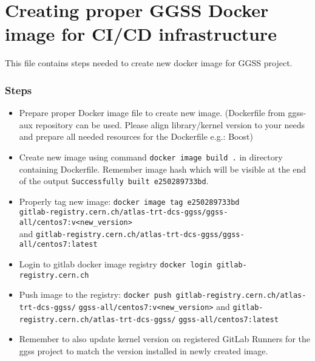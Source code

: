 \clearpage
\section{Creating proper GGSS Docker image for CI/CD infrastructure}
This file contains steps needed to create new docker image for GGSS project.

\subsubsection*{Steps}
\begin{itemize}
    \item Prepare proper Docker image file to create new image. (Dockerfile from ggss-aux repository can be used. Please align library/kernel version to your needs and prepare all needed resources for the Dockerfile e.g.: Boost)
    \item Create new image using command \lstinline{docker image build .} in directory containing Dockerfile. Remember image hash which will be visible at the end of the output \lstinline{Successfully built e250289733bd}.
    \item Properly tag new image:
    \lstinline{docker image tag e250289733bd} \\
    \lstinline{gitlab-registry.cern.ch/atlas-trt-dcs-ggss/ggss-all/centos7:v<new_version>} \\
    and \lstinline{gitlab-registry.cern.ch/atlas-trt-dcs-ggss/ggss-all/centos7:latest}
    \item Login to gitlab docker image registry \lstinline{docker login gitlab-registry.cern.ch}
    \item Push image to the registry: \lstinline{docker push gitlab-registry.cern.ch/atlas-trt-dcs-ggss/} \lstinline{ggss-all/centos7:v<new_version>} and \lstinline{gitlab-registry.cern.ch/atlas-trt-dcs-ggss/} \lstinline{ggss-all/centos7:latest}
    \item Remember to also update kernel version on registered GitLab Runners for the ggss project to match the version installed in newly created image.
\end{itemize}